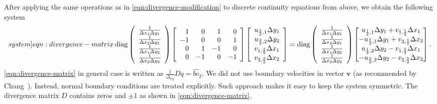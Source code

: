 \documentclass{article}
\numberwithin{equation}{section}
\begin{document}
After applying the same operations as in \cref{eqn:divergence-modification} to discrete continuity equations from above, we obtain the following system
\begin{equation}\label[system]{eqn:divergence-matrix}
\operatorname{diag}\left(\begin{array}{cccc}
\frac{1}{\Delta x_1 \Delta y_1} \\
\frac{1}{\Delta x_2 \Delta y_1} \\
\frac{1}{\Delta x_1 \Delta y_2} \\
\frac{1}{\Delta x_2 \Delta y_2}
\end{array}\right)
\left[ \begin{array}{rrrrrrrrrrrr}
1 & 0 & 1 & 0 \\
-1 & 0 & 0 & 1 \\
0 & 1 & -1 & 0  \\
0 & -1 & 0 & -1 
\end{array} \right]
\left[\begin{array}{l}
u_{\frac{3}{2},1} \Delta y_1 \\
u_{\frac{3}{2},2} \Delta y_2 \\
v_{1,\frac{3}{2}} \Delta x_1 \\
v_{2,\frac{3}{2}} \Delta x_2	 \\
\end{array}\right]=
\operatorname{diag}\left(\begin{array}{cccc}
\frac{1}{\Delta x_1 \Delta y_1} \\
\frac{1}{\Delta x_2 \Delta y_1} \\
\frac{1}{\Delta x_1 \Delta y_2} \\
\frac{1}{\Delta x_2 \Delta y_2}
\end{array}\right)
\begin{bmatrix}{}
u_{\frac{1}{2},1} \Delta y_1 + v_{1,\frac{1}{2}} \Delta x_1  \\
-u_{\frac{5}{2},1} \Delta y_1 + v_{2,\frac{1}{2}} \Delta x_2 \\
u_{\frac{1}{2},2} \Delta y_2 - v_{1,\frac{5}{2}} \Delta x_1 \\
-u_{\frac{5}{2},2} \Delta y_2-v_{2,\frac{5}{2}} \Delta x_2
\end{bmatrix}.
\end{equation}
\cref{eqn:divergence-matrix} in general case is written as $\frac{1}{\Delta_{xy}} D q=\hat{bc}_2$.
We did not use boundary velocities in vector $\boldsymbol{v}$ (as recommended by Chang~\cite{Chang:2002}). Instead, normal boundary conditions are treated explicitly. Such approach makes it easy to keep the system symmetric. The divergence matrix $D$ contains zeros and $\pm1$ as shown in \cref{eqn:divergence-matrix}.
\end{document}
